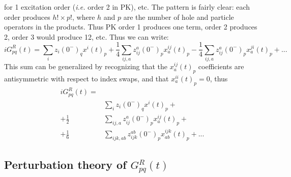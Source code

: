 \documentclass[aps,prb,preprint,groupaddress,floatfix]{revtex4}
\begin{document}
for 1 excitation order (\textit{i.e.} order 2 in PK), etc. The pattern is fairly
clear: each order produces $h! \times p!$, where $h$ and $p$ are the number of
hole and particle operators in the products. Thus PK order 1 produces one term,
order 2 produces 2, order 3 would produce 12, etc. Thus we can write:
\begin{equation}
iG^R_{pq}(t)=
\sum_i z_i(0^-)_q x^i(t)_p +
\frac{1}{4}\sum_{ij,a} z_{ij}^a(0^-)_p x^{ij}_a(t)_p - 
\frac{1}{4}\sum_{ij,a} z_{ij}^a(0^-)_p x^{ji}_a(t)_p + ...
\end{equation}
This sum can be generalized by recognizing that the $x^{ij}_a(t)_p$ coefficients
are antisymmetric with respect to index swaps, and that $x^{ii}_a(t)_p=0$, thus
\begin{equation}
\begin{split}
iG^R_{pq}(t)=&\\
&\sum_i z_i(0^-)_q x^i(t)_p + \\
+\frac{1}{2}&\sum_{ij,a}   z_{ij}^a(0^-)_p           x^{ij}_a(t)_p + \\ 
+\frac{1}{6}&\sum_{ijk,ab} z_{ijk}^{ab}(0^-)_p x^{ijk}_{ab}(t)_p + ...
\end{split}
\end{equation}

\subsection{Perturbation theory of $G^R_{pq}(t)$}
\end{document}
